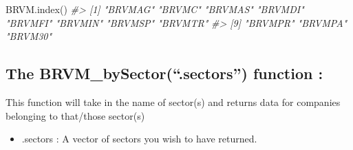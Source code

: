 \documentclass[
]{article}
\newenvironment{Shaded}{\begin{snugshade}}{\end{snugshade}}
\newcommand{\CommentTok}[1]{\textcolor[rgb]{0.56,0.35,0.01}{\textit{#1}}}
\newcommand{\FunctionTok}[1]{\textcolor[rgb]{0.00,0.00,0.00}{#1}}
\newcommand{\NormalTok}[1]{#1}
\providecommand{\tightlist}{%
  \setlength{\itemsep}{0pt}\setlength{\parskip}{0pt}}
\begin{document}
\begin{Shaded}
\begin{Highlighting}[]
\FunctionTok{BRVM.index}\NormalTok{()}
\CommentTok{\#\textgreater{}  [1] "BRVMAG" "BRVMC"  "BRVMAS" "BRVMDI" "BRVMFI" "BRVMIN" "BRVMSP" "BRVMTR"}
\CommentTok{\#\textgreater{}  [9] "BRVMPR" "BRVMPA" "BRVM30"}
\end{Highlighting}
\end{Shaded}

\hypertarget{the-brvm_bysector.sectors-function}{%
\subsection{\texorpdfstring{The \textbf{BRVM\_bySector(``.sectors'')}
function
:}{The BRVM\_bySector(``.sectors'') function :}}\label{the-brvm_bysector.sectors-function}}

This function will take in the name of sector(s) and returns data for
companies belonging to that/those sector(s)

\begin{itemize}
\tightlist
\item
  .sectors : A vector of sectors you wish to have returned.
\end{itemize}
\end{document}

